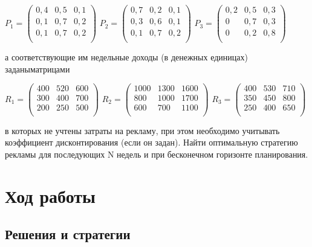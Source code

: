 \documentclass[14pt,a4paper,report]{report}
\begin{document}
$P_1 = 
 \begin{pmatrix}
0,4 & 0,5 & 0,1 \\
0,1 & 0,7 & 0,2 \\
0,1 & 0,7 & 0,2 \\
\end{pmatrix}$
$P_2 = 
 \begin{pmatrix}
0,7 & 0,2 & 0,1 \\
0,3 & 0,6 & 0,1 \\ 
0,1 & 0,7 & 0,2 \\ 
\end{pmatrix}$
$P_3 = 
 \begin{pmatrix}
0,2 & 0,5 & 0,3 \\
0 & 0,7 & 0,3 \\ 
0 & 0,2 & 0,8 \\ 
\end{pmatrix}$

а соответствующие им недельные доходы (в денежных единицах) заданыматрицами

$R_1 = 
 \begin{pmatrix}
 400 & 520 & 600 \\ 
300 & 400 & 700 \\ 
200 & 250 & 500 \\ 
\end{pmatrix}$
$R_2 = 
 \begin{pmatrix}
1000 & 1300 & 1600 \\ 
800 & 1000 & 1700 \\ 
600 & 700 & 1100 \\ 
\end{pmatrix}$
$R_3 = 
\begin{pmatrix}
400 & 530 & 710 \\ 
350 & 450 & 800 \\ 
250 & 400 & 650 \\ 
\end{pmatrix}$




в которых не учтены затраты на рекламу, при этом необходимо учитывать коэффициент дисконтирования (если он задан). Найти оптимальную стратегию рекламы для последующих N недель и при бесконечном горизонте планирования.

\section{Ход работы}

\subsection{Решения и стратегии}
\end{document}
